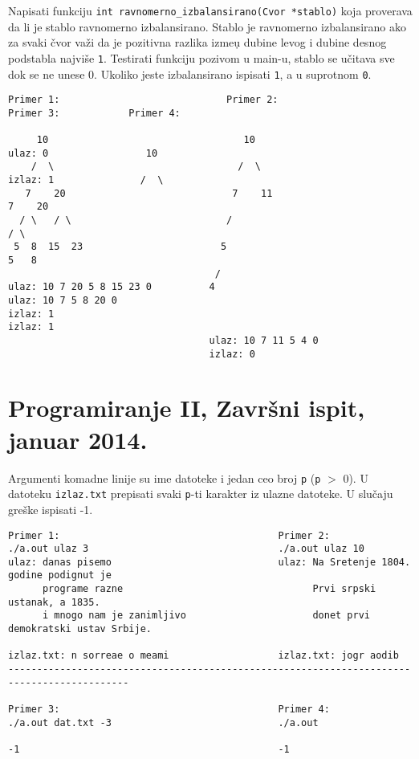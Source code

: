 \begin{z}
Napisati funkciju \verb|int ravnomerno_izbalansirano(Cvor *stablo)| koja proverava da li je stablo ravnomerno izbalansirano.
 Stablo je ravnomerno izbalansirano ako za svaki \v cvor va\v zi da je pozitivna razlika izme\d u dubine levog i dubine desnog podstabla najvi\v se \verb|1|.
Testirati funkciju pozivom u main-u, stablo se u\v citava sve dok se ne unese 0. Ukoliko jeste izbalansirano ispisati \verb|1|, a u suprotnom \verb|0|.
\end{z}
\begin{verbatim}
Primer 1:                             Primer 2:                    Primer 3:            Primer 4:

     10                                  10                        ulaz: 0                 10
    /  \                                /  \                       izlaz: 1               /  \
   7    20                             7    11                                           7    20
  / \   / \                           /                                                 / \
 5  8  15  23                        5                                                 5   8
                                    /
ulaz: 10 7 20 5 8 15 23 0          4                                                   ulaz: 10 7 5 8 20 0
izlaz: 1                                                                               izlaz: 1
                                   ulaz: 10 7 11 5 4 0
                                   izlaz: 0
\end{verbatim}



\section{Programiranje II, Zavr\v{s}ni ispit, januar 2014.}


\begin{z}
Argumenti komadne linije su ime datoteke i jedan ceo broj \verb|p| (\verb|p| $>$ 0).
U datoteku \verb|izlaz.txt| prepisati svaki \verb|p|-ti karakter iz ulazne datoteke.
U slu\v caju gre\v ske ispisati -1.
\end{z}
\begin{verbatim}
Primer 1:                                      Primer 2:
./a.out ulaz 3                                 ./a.out ulaz 10
ulaz: danas pisemo                             ulaz: Na Sretenje 1804. godine podignut je
      programe razne                                 Prvi srpski ustanak, a 1835.
      i mnogo nam je zanimljivo                      donet prvi demokratski ustav Srbije.

izlaz.txt: n sorreae o meami                   izlaz.txt: jogr aodib
-------------------------------------------------------------------------------------------

Primer 3:                                      Primer 4:
./a.out dat.txt -3                             ./a.out

-1                                             -1
\end{verbatim}


